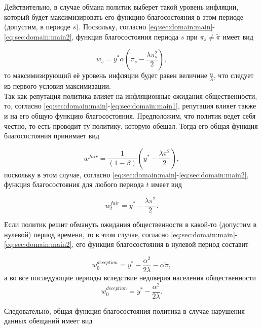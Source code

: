 Действительно, в случае обмана политик выберет такой уровень инфляции, который будет максимизировать его функцию благосостояния в этом периоде (допустим, в периоде $s$). Поскольку, согласно \eqref{eq:sec:domain:main}-\eqref{eq:sec:domain:main2}, функция благосостояния периода $s$ при $\pi_s\ne\tilde{\pi}$ имеет вид

\begin{equation}
	\label{eq:sec:domain:main3}
	w_s=y^*\alpha\left(\pi_s - \frac{\lambda\pi^2_s}{2} \right),
\end{equation}
то максимизирующий её уровень инфляции будет равен величине $\frac{\alpha}{\lambda}$, что следует из первого условия максимизации.\\

Так как репутация политика влияет на инфляционные ожидания общественности, то, согласно  \eqref{eq:sec:domain:main}-\eqref{eq:sec:domain:main1}, репутация влияет также и на его общую функцию благосостояния. Предположим, что политик ведет себя честно, то есть проводит ту политику, которую обещал. Тогда его общая функция благосостояния принимает вид

\begin{equation}
	w^{fair} = \frac{1}{(1-\beta)} \left( y^*-\frac{\lambda\pi^2}{2} \right),
\end{equation}
поскольку в этом случае, согласно \eqref{eq:sec:domain:main}-\eqref{eq:sec:domain:main2},  функция благосостояния для любого периода $t$ имеет вид

\begin{equation}
w^{fair}_t = y^*-\frac{\lambda\pi^2}{2}.
\end{equation}

Если политик решит обмануть ожидания общественности в какой-то (допустим в нулевой) период времени, то в этом случае, согласно \eqref{eq:sec:domain:main}-\eqref{eq:sec:domain:main2}, его функция благосостояния в нулевой период составит

\begin{equation}
w^{deception}_0 = y^*-\frac{\alpha^2}{2\lambda}-\alpha\tilde{\pi},
\end{equation}
а во все последующие периоды вследствие недоверия населения общественности
\begin{equation}
w^{deception}_0 = y^*-\frac{\alpha^2}{2\lambda}.
\end{equation}

Следовательно, общая функция благосостояния политика в случае нарушения данных обещаний имеет вид

